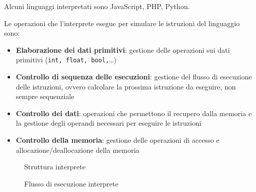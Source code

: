 \documentclass[12pt,a4paper]{article}
\begin{document}
Alcuni linguaggi interpretati sono JavaScript, PHP, Python.

Le operazioni che l'interprete esegue per simulare le istruzioni del linguaggio sono:
\begin{itemize}
\item \textbf{Elaborazione dei dati primitivi}: gestione delle operazioni sui dati primitivi (\texttt{int, float, bool,}\ldots)
\item \textbf{Controllo di sequenza delle esecuzioni}: gestione del flusso di esecuzione delle istruzioni, ovvero calcolare la prossima istruzione da eseguire, non sempre sequenziale
\item \textbf{Controllo dei dati}: operazioni che permettono il recupero dalla memoria e la gestione degli operandi necessari per eseguire le istruzioni
\item \textbf{Controllo della memoria}: gestione delle operazioni di accesso e allocazione\slash deallocazione della memoria
\end{itemize}

\begin{figure}[h!]
	\begin{center}
	  \caption{Struttura interprete}
	\end{center}
\end{figure}

\begin{figure}[h!]
	\begin{center}
	  \caption{Flusso di esecuzione interprete}
	\end{center}
\end{figure}
\end{document}
